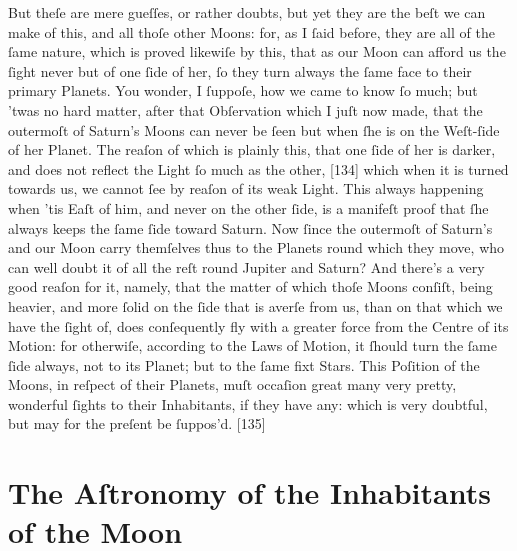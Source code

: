 \documentclass[letterpaper]{book}
\begin{document}
But theſe are mere gueſſes, or rather doubts, but yet they are the beſt we
can make of this, and all thoſe other Moons: for, as I ſaid before, they are
all of the ſame nature, which is proved likewiſe by this, that as our Moon
can afford us the ſight never but of one ſide of her, ſo they turn always
the ſame face to their primary Planets. You wonder, I ſuppoſe, how we came
to know ſo much; but 'twas no hard matter, after that Obſervation which I
juſt now made, that the outermoſt of Saturn's Moons can never be ſeen but
when ſhe is on the Weſt-ſide of her Planet. The reaſon of which is plainly
this, that one ſide of her is darker, and does not reflect the Light ſo much
as the other, [134] which when it is turned towards us, we cannot ſee by
reaſon of its weak Light. This always happening when 'tis Eaſt of him, and
never on the other ſide, is a manifeſt proof that ſhe always keeps the ſame
ſide toward Saturn. Now ſince the outermoſt of Saturn's and our Moon carry
themſelves thus to the Planets round which they move, who can well doubt it
of all the reſt round Jupiter and Saturn? And there's a very good reaſon for
it, namely, that the matter of which thoſe Moons conſiſt, being heavier, and
more ſolid on the ſide that is averſe from us, than on that which we have
the ſight of, does conſequently fly with a greater force from the Centre of
its Motion: for otherwiſe, according to the Laws of Motion, it ſhould turn
the ſame ſide always, not to its Planet; but to the ſame fixt Stars.  This
Poſition of the Moons, in reſpect of their Planets, muſt occaſion great many
very pretty, wonderful ſights to their Inhabitants, if they have any: which
is very doubtful, but may for the preſent be ſuppos'd.  [135]


\section{The Aſtronomy of the Inhabitants of the Moon}
\end{document}
